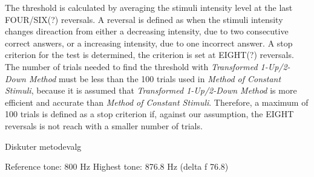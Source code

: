 \noindent
%
The threshold is calculated by averaging the stimuli intensity level at the last FOUR/SIX(?) reversals. A reversal is defined as when the stimuli intensity changes direaction from either a decreasing intensity, due to two consecutive correct answers, or a increasing intensity, due to one incorrect answer. A stop criterion for the test is determined, the criterion is set at EIGHT(?) reversals. The number of trials needed to find the threshold with  \textit{Transformed 1-Up/2-Down Method} must be less than the 100 trials used in \textit{Method of Constant Stimuli}, because it is assumed that \textit{Transformed 1-Up/2-Down Method} is more efficient and accurate than \textit{Method of Constant Stimuli}. Therefore, a maximum of 100 trials is defined as a stop criterion if, against our assumption, the EIGHT reversals is not reach with a smaller number of trials.           





Diskuter metodevalg

Reference tone: 800 Hz 
Highest tone: 876.8 Hz (delta f 76.8)
